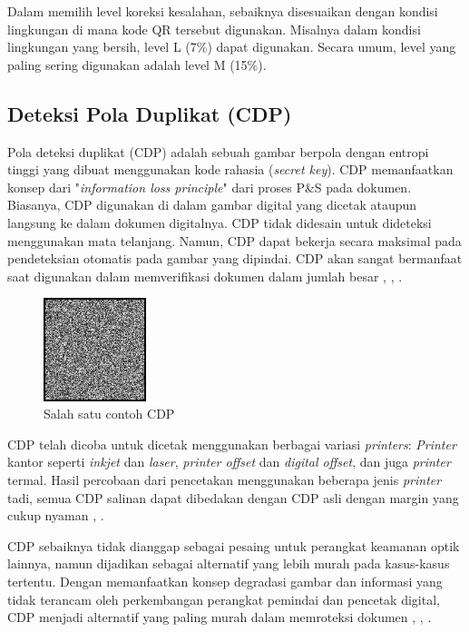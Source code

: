 Dalam memilih level koreksi kesalahan, sebaiknya disesuaikan dengan kondisi lingkungan di mana kode QR tersebut digunakan. Misalnya dalam kondisi lingkungan
yang bersih, level L (7\%) dapat digunakan. Secara umum, level yang paling sering digunakan adalah level M (15\%).

\subsection{Deteksi Pola Duplikat (CDP)}
Pola deteksi duplikat (CDP) adalah sebuah gambar berpola dengan entropi tinggi yang dibuat menggunakan kode rahasia (\emph{secret key}). CDP memanfaatkan
konsep dari "\emph{information loss principle}" dari proses P\&S pada dokumen. Biasanya, CDP digunakan di dalam gambar digital yang dicetak ataupun langsung ke
dalam dokumen digitalnya. CDP tidak didesain untuk dideteksi menggunakan mata telanjang. Namun, CDP dapat bekerja secara maksimal pada pendeteksian otomatis
pada gambar yang dipindai. CDP akan sangat bermanfaat saat digunakan dalam memverifikasi dokumen dalam jumlah besar \cite{picard2004digital},
\cite{picard2004towards}, \cite{}.

\begin{figure}[h]
	\centering
	\includegraphics[width=3cm]{contents/chapter-2/2-contohcdp.jpg}
	\caption{Salah satu contoh CDP}
	\label{Fig: 2-contohcdp}
\end{figure}

CDP telah dicoba untuk dicetak menggunakan berbagai variasi \emph{printers}: \emph{Printer} kantor seperti \emph{inkjet} dan \emph{laser}, \emph{printer
	offset} dan \emph{digital offset}, dan juga \emph{printer} termal. Hasil percobaan dari pencetakan menggunakan beberapa jenis \emph{printer} tadi, semua CDP
salinan dapat dibedakan dengan CDP asli dengan margin yang cukup nyaman \cite{picard2004digital}, \cite{picard2004towards}.

CDP sebaiknya tidak dianggap sebagai pesaing untuk perangkat keamanan optik lainnya, namun dijadikan sebagai alternatif yang lebih murah pada kasus-kasus
tertentu. Dengan memanfaatkan konsep degradasi gambar dan informasi yang tidak terancam oleh perkembangan perangkat pemindai dan pencetak digital, CDP menjadi
alternatif yang paling murah dalam memroteksi dokumen \cite{picard2004digital}, \cite{picard2004towards}, \cite{harwood1998optical}.

